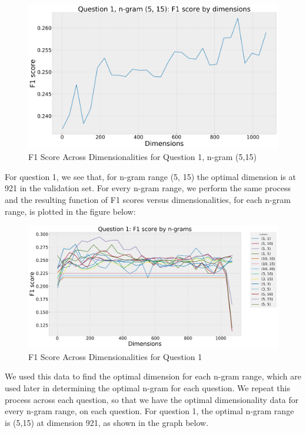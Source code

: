 \documentclass[10pt,letterpaper]{article}
\begin{document}
\begin{figure}[ht]
\begin{center}
\includegraphics[scale = 0.2]{img/Q1Ngram5to15.png}
\end{center}
\caption{F1 Score Across Dimensionalities for Question 1, n-gram (5,15)}
\end{figure}

For question 1, we see that, for n-gram range (5, 15) the optimal dimension is at 921 in the validation set. For every n-gram range, we perform the same process and the resulting function of F1 scores versus dimensionalities, for each n-gram range, is plotted in the figure below:

\begin{figure}[ht]
\begin{center}
\includegraphics[scale = 0.175]{img/Q1F1ByNgramsAcrossDimensions.png}
\end{center}
\caption{F1 Score Across Dimensionalities for Question 1}
\end{figure}


We used this data to find the optimal dimension for each n-gram range, which are used later in determining the optimal n-gram for each question. We repeat this process across each question, so that we have the optimal dimensionality data for every n-gram range, on each question. For question 1, the optimal n-gram range is (5,15) at dimension 921, as shown in the graph below.
\end{document}

